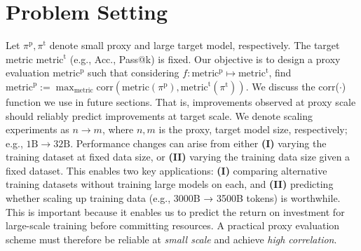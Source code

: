 % 

\section{Problem Setting} \label{sec:problem}
Let $\pi^\text{p}, \pi^\text{t}$ denote small proxy and large target model, respectively. The target metric $\text{metric}^\text{t}$ (e.g., Acc., Pass@k) is fixed. Our objective is to design a proxy evaluation $\text{metric}^\text{p}$ such that considering $f: \text{metric}^\text{p} \mapsto \text{metric}^\text{t}$, find $\text{metric}^\text{p} := \max_{\text{metric}} \text{corr}(\text{metric}(\pi^\text{p}), \text{metric}^\text{t}(\pi^\text{t}))$. We discuss the corr($\cdot$) function we use in future sections. That is, improvements observed at proxy scale should reliably predict improvements at target scale. We denote scaling experiments as $n \rightarrow m$, where $n, m$ is the proxy, target model size, respectively; e.g., $1\text{B} \rightarrow 32\text{B}$. Performance changes can arise from either \textbf{(I)} varying the training dataset at fixed data size, or \textbf{(II)} varying the training data size given a fixed dataset. This enables two key applications: \textbf{(I)} comparing alternative training datasets without training large models on each, and \textbf{(II)} predicting whether scaling up training data (e.g., 3000B → 3500B tokens) is worthwhile. This is important because it enables us to predict the return on investment for large-scale training before committing resources. A practical proxy evaluation scheme must therefore be reliable at \textit{small scale} and achieve \textit{high correlation}.






